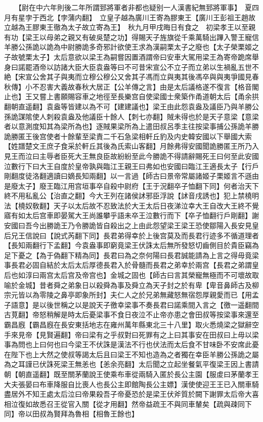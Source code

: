 　　【尉在中六年則後二年所謂郅將軍者非都也疑别一人漢書紀無郅將軍事】　夏四月有星孛于西北【孛蒲内翻】　立皇子越為廣川王寄為膠東王【廣川王彭祖王趙故立越為王膠東王徹為太子故立寄為王】　秋九月甲戌晦日有食之　初梁孝王以至親有功【梁王以母弟之親又有破吳楚之功】得賜天子旌旗從千乘萬騎出蹕入警王寵信羊勝公孫詭以詭為中尉勝詭多奇邪計欲使王求為漢嗣栗太子之廢也【太子榮栗姬之子故號栗太子】太后意欲以梁王為嗣嘗因置酒謂帝曰安車大駕用梁王為寄帝跪席舉身曰諾罷酒帝以訪諸大臣大臣袁盎等曰不可昔宋宣公不立子而立弟以生禍亂五世不絶【宋宣公舍其子與夷而立穆公穆公又舍其子馮而立與夷其後馮卒與與夷爭國見春秋傳】小不忍害大義故春秋大居正【公羊傳之言】由是太后議格遂不復言【格音閣止也】王又嘗上書願賜容車之地徑至長樂宫自使梁國士衆築作甬道朝太后【甬余拱翻朝直遥翻】袁盎等皆建以為不可【建建議也】梁王由此怨袁盎及議臣乃與羊勝公孫詭謀隂使人刺殺袁盎及他議臣十餘人【刺七亦翻】賊未得也於是天子意梁【意梁者以意測度知其為梁所為也】逐賊果梁所為上遣田叔呂季主往按梁事捕公孫詭羊勝詭勝匿王後宫使者十餘輩至梁責二千石急梁相軒丘豹及内史韓安國以下舉國大索【姓譜楚文王庶子食采於軒丘其後為氏索山客翻】月餘弗得安國聞詭勝匿王所乃入見王而泣曰主辱者臣死大王無良臣故紛紛至此今勝詭不得請辭賜死王曰何至此安國泣數行下曰大王自度於皇帝孰與臨江王親王曰弗如也安國曰臨江王適長太子【行戶剛翻度徒洛翻適讀曰嫡長知兩翻】以一言過【師古曰景帝常屬諸姬子栗姬言不遜由是廢太子】廢王臨江用宫垣事卒自殺中尉府【王于況翻卒子恤翻下同】何者治天下終不用私亂公【治直之翻】今大王列在諸侯訹邪臣浮說【訹音戌誘也】犯上禁橈明法【橈奴敎翻】天子以太后故不忍致法於大王太后日夜涕泣幸大王自改大王終不覺寤有如太后宫車即晏駕大王尚誰攀乎語未卒王泣數行而下【卒子恤翻行戶剛翻】謝安國曰吾今出勝詭王乃令勝詭皆自殺出之上由此怨望梁王梁王恐使鄒陽入長安見皇后兄王信說曰【說式芮翻下同】長君弟得幸於上後宫莫及而長君行迹多不循道理者【長知兩翻行下孟翻】今袁盎事即窮竟梁王伏誅太后無所發怒切齒側目於貴臣竊為足下憂之【為于偽翻下精為同】長君曰為之奈何陽曰長君誠能請為上言之得毋竟梁事長君必固自結於太后太后厚德長君入於骨髓而長君之弟幸於兩宫【長君之弟謂皇后也如淳曰兩宫太后宫及帝宫也】金城之固也【師古曰言其榮寵無極而不可壞故取喻於金城】昔者舜之弟象日以殺舜為事及舜立為天子封之於有卑【卑音鼻師古及柳宗元皆以為零陵之鼻亭即象所封】夫仁人之於兄弟無藏怒無宿怨厚親愛而已【用孟子語意】是以後世稱之以是說天子徼幸梁事不奏長君曰諾乘間入言之【徼一遥翻間古莧翻】帝怒稍解是時太后憂梁事不食日夜泣不止帝亦患之會田叔等按梁事來還至霸昌廐【霸昌廐在長安東括地志在雍州萬年縣東北三十八里】取火悉燒梁之獄辭空手來見帝【見賢遍翻】帝曰梁有之乎叔對曰死罪有之上曰其事安在田叔曰上毋以梁事為問也上曰何也曰今梁王不伏誅是漢法不行也伏法而太后食不甘味卧不安席此憂在陛下也上大然之使叔等謁太后且曰梁王不知也造為之者獨在幸臣羊勝公孫詭之屬為之耳謹已伏誅死梁王無恙也【恙余亮翻】太后聞之立起坐餐氣平復梁王因上書請朝【朝直遥翻】既至關茅蘭說王使乘布車從兩騎入匿於長公主園【服䖍曰茅蘭孝王大夫張晏曰布車降服自比喪人也長公主即館陶長公主嫖】漢使使迎王王已入關車騎盡居外不知王處太后泣曰帝果殺吾子帝憂恐於是梁王伏斧質於闕下謝罪太后帝大喜相泣復如故悉召王從官入關【從才用翻】然帝益疏王不與同車輦矣【疏與疎同下同】帝以田叔為賢拜為魯相【相魯王餘也】

